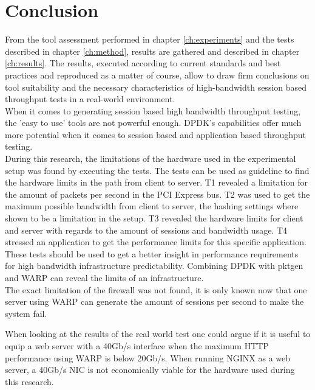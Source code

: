 \chapter{Conclusion}\label{ch:conclusion}
From the tool assessment performed in chapter \ref{ch:experiments} and the tests described in chapter \ref{ch:method}, results are gathered and described in chapter \ref{ch:results}.
The results, executed according to current standards and best practices and reproduced as a matter of course, allow to draw firm conclusions on tool suitability and the necessary characteristics of high-bandwidth session based throughput tests in a real-world environment. \\
When it comes to generating session based high bandwidth throughput testing, the 'easy to use' tools are not powerful enough. 
DPDK's capabilities offer much more potential when it comes to session based and application based throughput testing. \\ 

During this research, the limitations of the hardware used in the experimental setup was found by executing the tests. 
The tests can be used as guideline to find the hardware limits in the path from client to server. 
T1 revealed  a limitation for the amount of packets per second in the PCI Express bus. 
T2 was used to get the maximum possible bandwidth from client to server, the hashing settings where shown to be a limitation in the setup.
T3 revealed the hardware limits for client and server with regards to the amount of sessions and bandwidth usage.
T4 stressed an application to get the performance limits for this specific application. \\ 

These tests should be used to get a better insight in performance requirements for high bandwidth infrastructure predictability.
Combining DPDK with pktgen and WARP can reveal the limits of an infrastructure. \\

The exact limitation of the firewall was not found, it is only known now that one server using WARP can generate the amount of sessions per second to make the system fail.

When looking at the results of the real world test one could argue if it is useful to equip a web server with a 40Gb/s interface when the maximum HTTP performance using WARP is below 20Gb/s.
When running NGINX as a web server, a 40Gb/s NIC is not economically viable for the hardware used during this research. 

